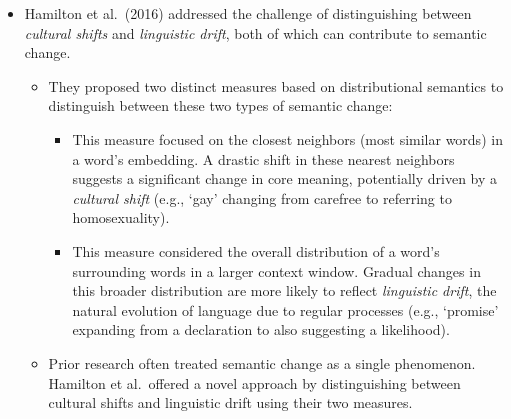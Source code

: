 \begin{itemize}
    \item {}
    Hamilton et al.\ (2016) addressed the challenge of distinguishing between \emph{cultural shifts} and \emph{linguistic drift}, both of which can contribute to semantic change.
    \begin{itemize}
        \item They proposed two distinct measures based on distributional semantics to distinguish between these two types of semantic change:
        \begin{itemize}
            \item {} This measure focused on the closest neighbors (most similar words) in a word's embedding.
            A drastic shift in these nearest neighbors suggests a significant change in core meaning, potentially driven by a \emph{cultural shift}
            (e.g., `gay' changing from carefree to referring to homosexuality).
            \item {} This measure considered the overall distribution of a word's surrounding words in a larger context window.
            Gradual changes in this broader distribution are more likely to reflect \emph{linguistic drift}, the natural evolution of language due to regular processes
            (e.g., `promise' expanding from a declaration to also suggesting a likelihood).
        \end{itemize}
        \item Prior research often treated semantic change as a single phenomenon.
        Hamilton et al.\ offered a novel approach by distinguishing between cultural shifts and linguistic drift using their two measures.
    \end{itemize}


\end{itemize}
